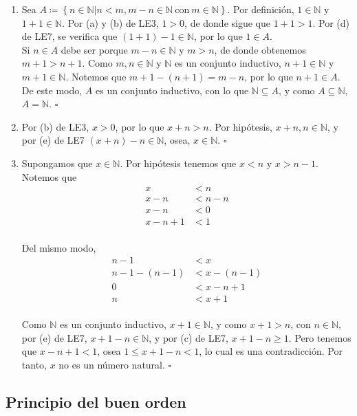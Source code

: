 \documentclass[11pt]{article}
\newcommand{\N}{\mathbb{N}}
\def\defined #1{\coloneqq \left\{#1\right\}}
\begin{document}
\begin{enumerate}[label=\alph*)]
    \item Sea $A \defined{n\in \N| n<m, m-n\in\N \ \text{con} \ m\in\N}$. Por definición, $1\in \N$ y $1+1\in \N$. Por (a) y (b) de LE3, $1>0$, de donde sigue que $1+1>1$. Por (d) de LE7, se verifica que $(1+1)-1\in \N$, por lo que $1\in A$. \\[5pt] Si $n \in A$ debe ser porque $m-n\in \N$ y $m>n$, de donde obtenemos $m+1>n+1$. Como $m,n\in \N$ y $\N$ es un conjunto inductivo, $n+1\in \N$ y $m+1 \in \N$. Notemos que $m+1-(n+1)=m-n$, por lo que $n+1\in A$. De este modo, $A$ es un conjunto inductivo, con lo que $\N \subseteq A$, y como $A\subseteq \N$, $A=\N$. \mbox{}\hfill $\square$ 
    
    
    \item Por (b) de LE3, $x>0$, por lo que $x+n>n$. Por hipótesis, $x+n, n\in \N$, y por (e) de LE7 $(x+n)-n \in \N$, osea, $x\in \N$. \mbox{}\hfill $\square$
    
    \item Supongamos que $x\in \N$. Por hipótesis tenemos que $x<n$ y $x>n-1$. Notemos que \begin{align*}
        x &< n\\
        x -n &< n-n\\
        x-n &< 0\\
        x-n +1 &< 1
    \end{align*}\\
    Del mismo modo, \begin{align*}
        n-1 &< x\\
        n-1-(n-1) &< x - (n-1)\\
        0 &< x-n+1\\
        n &< x+1
    \end{align*}\\
    Como $\N$ es un conjunto inductivo, $x+1\in \N$, y como $x+1>n$, con $n\in \N$, por (e) de LE7, $x+1-n \in \N$, y por (c) de LE7, $x+1-n\geq 1$. Pero tenemos que $x-n+1<1$, osea $1\leq x+1-n<1$, lo cual es una contradicción. Por tanto, $x$ no es un número natural. \mbox{}\hfill $\square$
\end{enumerate}

\subsection*{Principio del buen orden}
\end{document}
